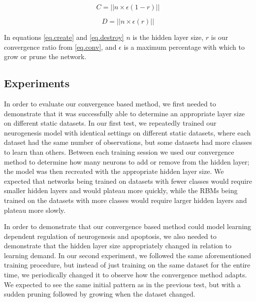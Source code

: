 \begin{equation}
C = ||n\times\epsilon(1 - r)|| \label{eq.create}
\end{equation}

\begin{equation}
D = ||n\times\epsilon(r)|| \label{eq.destroy}
\end{equation}

In equations \ref{eq.create} and \ref{eq.destroy} $n$ is the hidden layer 
size, $r$ is our convergence ratio from \ref{eq.conv}, and 
$\epsilon$ is a maximum percentage with which to grow or prune the network. 

\subsection{Experiments}

In order to evaluate our convergence based method, 
we first needed to demonstrate that it was successfully able to determine an 
appropriate layer size on different static datasets. 
In our first test, we 
repeatedly trained our neurogenesis model with 
identical settings on different static datasets, 
where each dataset had the same number of observations, but 
some datasets had more classes to learn than others. 
Between each 
training session we used our convergence method to determine 
how many neurons to add or remove from the hidden layer; the model 
was then recreated with the appropriate hidden layer size. 
We expected that networks being trained on datasets with fewer classes would 
require smaller hidden layers and would plateau more quickly, 
while the RBMs being trained on the datasets with more classes would require larger 
hidden layers and plateau more slowly.

In order to demonstrate that our convergence based method could model 
learning dependent regulation of neurogenesis and apoptosis, we 
also needed to demonstrate that the hidden layer size appropriately 
changed in relation to learning demand. 
In our second experiment, we 
followed the same aforementioned training procedure, but instead of 
just training on the same dataset for the entire time, we periodically 
changed it to observe how the convergence method adapts. 
We expected 
to see the same initial pattern as in the previous test, 
but with a sudden pruning followed by growing 
when the dataset changed. 

